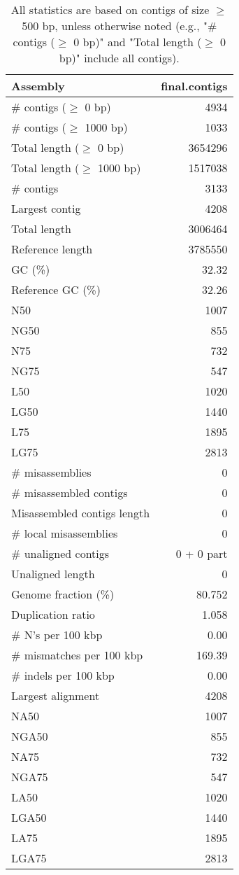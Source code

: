 \documentclass[12pt,a4paper]{article}
\begin{document}
\begin{table}[ht]
\begin{center}
\caption{All statistics are based on contigs of size $\geq$ 500 bp, unless otherwise noted (e.g., "\# contigs ($\geq$ 0 bp)" and "Total length ($\geq$ 0 bp)" include all contigs).}
\begin{tabular}{|l*{1}{|r}|}
\hline
Assembly & final.contigs \\ \hline
\# contigs ($\geq$ 0 bp) & 4934 \\ \hline
\# contigs ($\geq$ 1000 bp) & 1033 \\ \hline
Total length ($\geq$ 0 bp) & 3654296 \\ \hline
Total length ($\geq$ 1000 bp) & 1517038 \\ \hline
\# contigs & 3133 \\ \hline
Largest contig & 4208 \\ \hline
Total length & 3006464 \\ \hline
Reference length & 3785550 \\ \hline
GC (\%) & 32.32 \\ \hline
Reference GC (\%) & 32.26 \\ \hline
N50 & 1007 \\ \hline
NG50 & 855 \\ \hline
N75 & 732 \\ \hline
NG75 & 547 \\ \hline
L50 & 1020 \\ \hline
LG50 & 1440 \\ \hline
L75 & 1895 \\ \hline
LG75 & 2813 \\ \hline
\# misassemblies & 0 \\ \hline
\# misassembled contigs & 0 \\ \hline
Misassembled contigs length & 0 \\ \hline
\# local misassemblies & 0 \\ \hline
\# unaligned contigs & 0 + 0 part \\ \hline
Unaligned length & 0 \\ \hline
Genome fraction (\%) & 80.752 \\ \hline
Duplication ratio & 1.058 \\ \hline
\# N's per 100 kbp & 0.00 \\ \hline
\# mismatches per 100 kbp & 169.39 \\ \hline
\# indels per 100 kbp & 0.00 \\ \hline
Largest alignment & 4208 \\ \hline
NA50 & 1007 \\ \hline
NGA50 & 855 \\ \hline
NA75 & 732 \\ \hline
NGA75 & 547 \\ \hline
LA50 & 1020 \\ \hline
LGA50 & 1440 \\ \hline
LA75 & 1895 \\ \hline
LGA75 & 2813 \\ \hline
\end{tabular}
\end{center}
\end{table}
\end{document}
